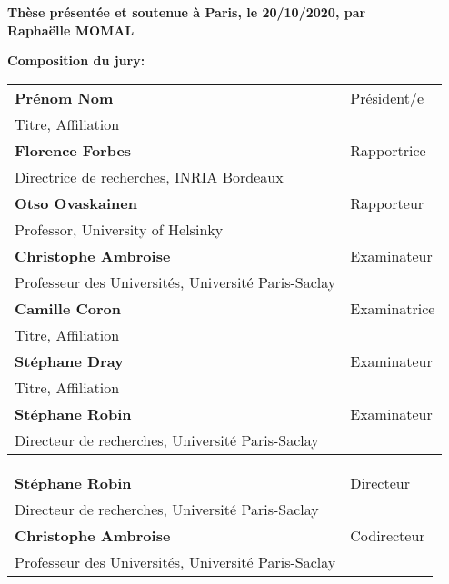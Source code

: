 \begin{titlepage}
\textbf{Thèse présentée et soutenue à Paris, le 20/10/2020, par}\\
\bigskip
\Large {\color{Prune} \textbf{Raphaëlle MOMAL}}


\vspace{\fill} %

\flushleft \small \textbf{Composition du jury:}
\bigskip



\scriptsize
\begin{tabular}{|p{8cm}l}
\arrayrulecolor{Prune}
\textbf{Prénom Nom} &   Président/e\\ 
Titre, Affiliation & \\
\textbf{Florence Forbes} &  Rapportrice \\ 
Directrice de recherches, INRIA Bordeaux   &   \\ 
\textbf{Otso Ovaskainen} &  Rapporteur \\ 
Professor, University of Helsinky  &   \\ 
\textbf{Christophe Ambroise} &  Examinateur \\ 
Professeur des Universités, Université Paris-Saclay  &   \\ 
\textbf{Camille Coron} &  Examinatrice \\ 
Titre, Affiliation   &   \\ 
\textbf{Stéphane Dray} &  Examinateur \\ 
Titre, Affiliation   &   \\ 
\textbf{Stéphane Robin} &   Examinateur\\ 
Directeur de recherches, Université Paris-Saclay & \\

\end{tabular} 

\medskip
\begin{tabular}{|p{8cm}l}\arrayrulecolor{white}
\textbf{Stéphane Robin} &   Directeur\\ 
Directeur de recherches, Université Paris-Saclay & \\
\textbf{Christophe Ambroise} &   Codirecteur\\ 
Professeur des Universités, Université Paris-Saclay  &   \\ 


\end{tabular} 


\end{titlepage}
